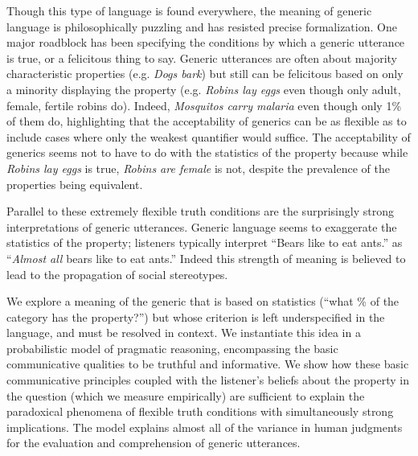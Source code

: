 \documentclass[11pt,stdletter,dateno,sigleft]{newlfm} %
\begin{document}
\begin{newlfm}
Though this type of language is found everywhere, the meaning of generic language is philosophically puzzling and has resisted precise formalization. 
One major roadblock has been specifying the conditions by which a generic utterance is true, or a felicitous thing to say.
Generic utterances are often about majority characteristic properties (e.g. \emph{Dogs bark}) but still can be felicitous based on only a minority displaying the property (e.g. \emph{Robins lay eggs} even though only adult, female, fertile robins do). 
Indeed, \emph{Mosquitos carry malaria} even though only 1\% of them do, highlighting that the acceptability of generics can be as flexible as to include cases where only the weakest quantifier would suffice. 
The acceptability of generics seems not to have to do with the statistics of the property because while \emph{Robins lay eggs} is true, \emph{Robins are female} is not, despite the prevalence of the properties being equivalent. 

Parallel to these extremely flexible truth conditions are the surprisingly strong interpretations of generic utterances.
Generic language seems to exaggerate the statistics of the property; listeners typically interpret ``Bears like to eat ants.'' as ``\emph{Almost all} bears like to eat ants.''
Indeed this strength of meaning is believed to lead to the propagation of social stereotypes. 


% 

We explore a meaning of the generic that is based on statistics (``what \% of the category has the property?'') but 
whose criterion is left underspecified in the language, and must be resolved in context.
We instantiate this idea in a probabilistic model of pragmatic reasoning, encompassing the basic communicative qualities to be truthful and informative. 
We show how these basic communicative principles coupled with the listener's beliefs about the property in the question (which we measure empirically) are sufficient to explain the paradoxical phenomena of flexible truth conditions with simultaneously strong implications.
The model explains almost all of the variance in human judgments for the evaluation and comprehension of generic utterances.


\end{newlfm}
\end{document}
